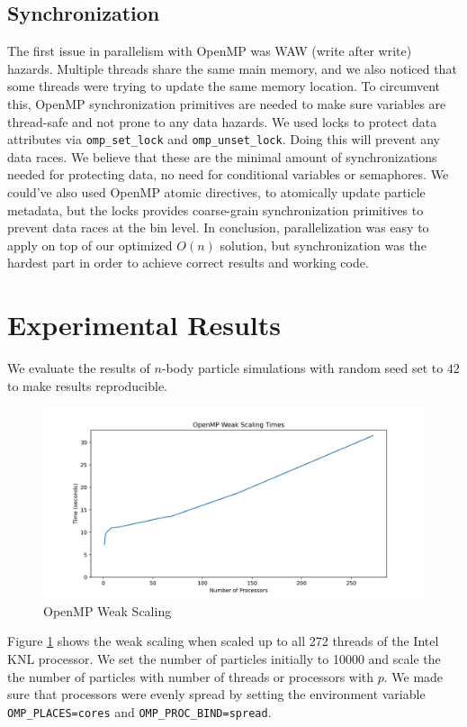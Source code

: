 \documentclass{article}
\begin{document}
\subsection{Synchronization}
The first issue in parallelism with OpenMP was WAW (write after write) hazards. Multiple threads share the same main memory, and we also noticed that some threads were trying to update the same memory location. To circumvent this, OpenMP synchronization primitives are needed to make sure variables are thread-safe and not prone to any data hazards. We used locks to protect data attributes via \verb|omp_set_lock| and \verb|omp_unset_lock|. Doing this will prevent any data races. We believe that these are the minimal amount of synchronizations needed for protecting data, no need for conditional variables or semaphores. We could've also used OpenMP atomic directives, to atomically update particle metadata, but the locks provides coarse-grain synchronization primitives to prevent data races at the bin level. In conclusion, parallelization was easy to apply on top of our optimized $O(n)$ solution, but synchronization was the hardest part in order to achieve correct results and working code.

\section{Experimental Results}
We evaluate the results of $n$-body particle simulations with random seed set to $42$ to make results reproducible.

\begin{figure}[H]
\centering
\includegraphics[width=6in]{figures/openmp_weak_scaling_times.png}
\caption{OpenMP Weak Scaling}
\label{fig:openmp-weak-scaling}
\end{figure}

Figure \ref{fig:openmp-weak-scaling} shows the weak scaling when scaled up to all 272 threads of the Intel KNL processor. We set the number of particles initially to 10000 and scale the the number of particles with number of threads or processors with $p$. We made sure that processors were evenly spread by setting the environment variable \verb|OMP_PLACES=cores| and \verb|OMP_PROC_BIND=spread|.
\end{document}
